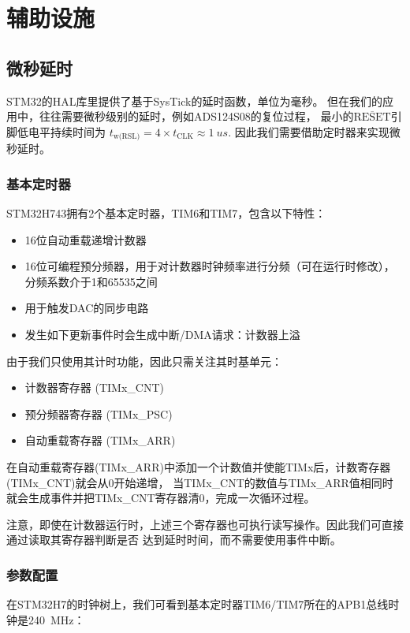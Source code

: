 \section{辅助设施}
\subsection{微秒延时}\label{sec:tim}
STM32的HAL库里提供了基于SysTick的延时函数，单位为毫秒。
但在我们的应用中，往往需要微秒级别的延时，例如ADS124S08的复位过程，
最小的$\overline{\text{RESET}}$引脚低电平持续时间为
$t_\textrm{w(RSL)} = 4\times t_\textrm{CLK}\approx\SI{1}{us}$.
因此我们需要借助定时器来实现微秒延时。

\subsubsection{基本定时器}
STM32H743拥有2个基本定时器，TIM6和TIM7，包含以下特性：

\begin{itemize}
    \item 16位自动重载递增计数器
    \item 16位可编程预分频器，用于对计数器时钟频率进行分频（可在运行时修改），
    分频系数介于1和65535之间
    \item 用于触发DAC的同步电路
    \item 发生如下更新事件时会生成中断/DMA请求：计数器上溢
\end{itemize}

由于我们只使用其计时功能，因此只需关注其时基单元：

\begin{itemize}
    \item 计数器寄存器 (TIMx\_CNT)
    \item 预分频器寄存器 (TIMx\_PSC)
    \item 自动重载寄存器 (TIMx\_ARR)
\end{itemize}

在自动重载寄存器(TIMx\_ARR)中添加一个计数值并使能TIMx后，计数寄存器(TIMx\_CNT)就会从0开始递增，
当TIMx\_CNT的数值与TIMx\_ARR值相同时就会生成事件并把TIMx\_CNT寄存器清0，完成一次循环过程。

注意，即使在计数器运行时，上述三个寄存器也可执行读写操作。因此我们可直接通过读取其寄存器判断是否
达到延时时间，而不需要使用事件中断。

\subsubsection{参数配置}
在STM32H7的时钟树上，我们可看到基本定时器TIM6/TIM7所在的APB1总线时钟是\SI{240}{MHz}：

